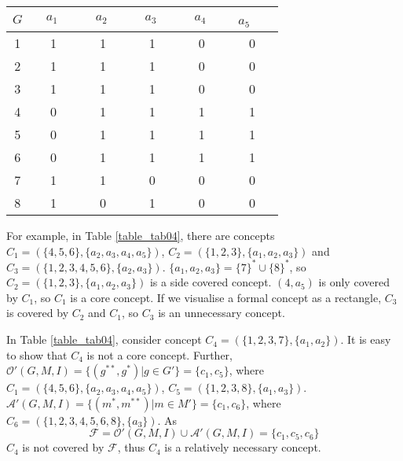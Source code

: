\documentclass[11pt]{article}
\numberwithin{equation}{subsection}
\begin{document}
 \begin{table*}[ht]
            \begin{center}
                \begin{normalsize}
                    \caption{Formal context $(G, M, I_4)$}
                    \label{table_tab04}
                    \begin{tabular}
                        {|c|c c  c  c  c|}
                        \hline
                        $G$     & $\ \ \ \ a_1\ \ \ \ \ $       &  $\ \ \ \ a_2\ \ \ \ \ $  &  $\ \ \ \ a_3\ \ \ \ \ $  & $\ \ \ \ a_4\ \ \ \ \ $  &  $\ \ a_5$\ \ \  \\
                       \hline
 1 & 1   & 1  &  1  & 0 &  0  \\

 2 & 1  &  1  & 1 &  0  &  0   \\

 3 & 1   & 1 &  1  &  0  &  0   \\

4 & 0 &  1  & 1  & 1   &   1  \\

5 & 0 &  1  &  1  &  1 &   1  \\

6 & 0 &  1  &  1  &  1 &   1  \\

7 & 1 &  1  &  0 &  0 &  0  \\

8 & 1 &  0  &  1 &  0 &  0  \\

\hline
                    \end{tabular}
                \end{normalsize}
            \end{center}
        \end{table*}





For example, in Table \ref{table_tab04},   there are concepts $C_1=(\{4,5,6\},\{ a_2, a_3, a_4, a_5\}) $, $C_2=(\{1,2,3\},\{a_1, a_2, a_3\}) $ and $C_3=(\{1,2,3,4,5,6\},\{ a_2, a_3\}) $.
$\{a_1, a_2, a_3\}=\{7\}^* \cup \{8\}^*$, so $C_2=(\{1,2,3\},\{a_1, a_2, a_3\}) $ is a side covered concept.
  $(4, a_5)$ is only covered by  $C_1$, so $C_1$ is a core   concept. If we visualise a formal concept as a rectangle,   $C_3$ is covered by  $C_2$ and  $C_1$, so   $C_3$ is an unnecessary concept.


In Table \ref{table_tab04},   consider concept $C_4=(\{1,2,3,7\},\{ a_1, a_2\}) $. It is easy to show that  $C_4$ is not a core   concept.
Further,
$ \mathcal{O}'(G,M,I)=\{ (g^{**},g^*)  | g\in G' \} =\{ c_1, c_5\}$, where $C_1=(\{4,5,6\},\{ a_2, a_3, a_4, a_5\}) $, $C_5=(\{1,2,3,8\},\{ a_1, a_3\}) $.
$  \mathcal{A}'(G,M,I)=\{ (m^{*},m^{**})  | m\in M' \} =\{ c_1, c_6\}$,  where $C_6=(\{1,2,3,4,5,6,8\},\{  a_3\}) $. As \[  \mathcal{F}=  \mathcal{O}'(G,M,I) \cup  \mathcal{A}'(G,M,I) =\{ c_1, c_5, c_6\}\] $C_4$ is not covered by $  \mathcal{F}$,
 thus   $C_4$ is a   relatively necessary concept.
\end{document}
